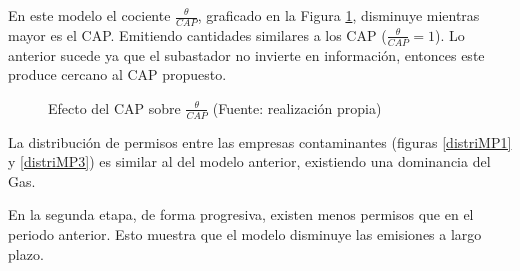 En este modelo el cociente $\frac{\theta}{CAP}$, graficado en la Figura \ref{rendcapMP2}, disminuye mientras mayor es el CAP. Emitiendo cantidades similares a los CAP ($\frac{\theta}{CAP} = 1$). Lo anterior sucede ya que el subastador no invierte en información, entonces este produce cercano al CAP propuesto.
\vspace{2.5mm}


\begin{figure}[H]
\centering
{}
\caption{{\footnotesize Efecto del CAP sobre $\frac{\theta}{CAP}$ (Fuente: realización propia)}}
\label{rendcapMP2}
\end{figure}

La distribución de permisos entre las empresas contaminantes (figuras \ref{distriMP1} y \ref{distriMP3}) es similar al del modelo anterior, existiendo una dominancia del Gas.
\vspace{2.5mm}

En la segunda etapa, de forma progresiva, existen menos permisos que en el periodo anterior. Esto muestra que el modelo disminuye las emisiones a largo plazo.

